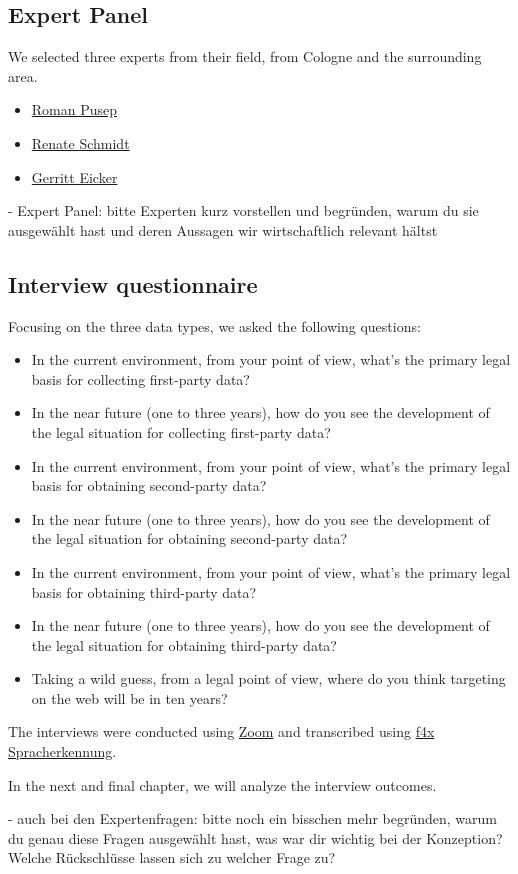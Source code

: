 \subsection{Expert Panel}

We selected three experts from their field, from Cologne and the surrounding area.

\begin{itemize}
 \item \href{https://www.linkedin.com/in/roman-pusep-36b33374/}{Roman Pusep}
 \item \href{https://www.linkedin.com/in/renate-schmid-535233113/}{Renate Schmidt}
 \item \href{https://www.linkedin.com/in/eicker/}{Gerritt Eicker}
\end{itemize}

- Expert Panel: bitte Experten kurz vorstellen und begründen, warum du sie ausgewählt hast und deren Aussagen wir wirtschaftlich relevant hältst

\subsection{Interview questionnaire}

Focusing on the three data types, we asked the following questions:

\begin{itemize}
 \item In the current environment, from your point of view, what's the primary legal basis for collecting first-party data?
 \item In the near future (one to three years), how do you see the development of the legal situation for collecting first-party data?
 \item In the current environment, from your point of view, what's the primary legal basis for obtaining second-party data?
 \item In the near future (one to three years), how do you see the development of the legal situation for obtaining second-party data?
 \item In the current environment, from your point of view, what's the primary legal basis for obtaining third-party data?
 \item In the near future (one to three years), how do you see the development of the legal situation for obtaining third-party data?
 \item Taking a wild guess, from a legal point of view, where do you think targeting on the web will be in ten years?
\end{itemize}

The interviews were conducted using \href{https://zoom.us/}{Zoom} and transcribed using \href{https://f4x.audiotranskription.de/}{f4x Spracherkennung}.

In the next and final chapter, we will analyze the interview outcomes.

- auch bei den Expertenfragen: bitte noch ein bisschen mehr begründen, warum du genau diese Fragen ausgewählt hast, was war dir wichtig bei der Konzeption? Welche Rückschlüsse lassen sich zu welcher Frage zu?

